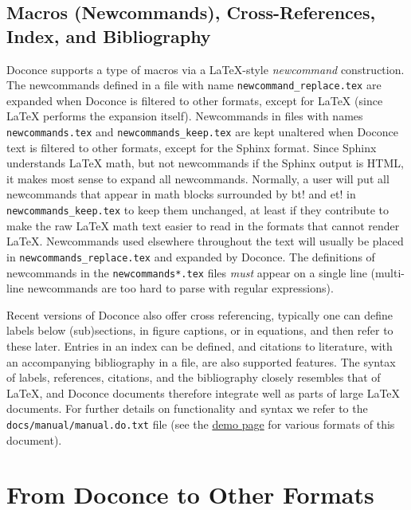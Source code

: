 \documentclass{article}
\begin{document}
\subsection{Macros (Newcommands), Cross-References, Index, and Bibliography}

Doconce supports a type of macros via a {\LaTeX}-style \emph{newcommand}
construction.  The newcommands defined in a file with name
{\fontsize{10pt}{10pt}\verb!newcommand_replace.tex!} are expanded when Doconce is filtered to
other formats, except for {\LaTeX} (since {\LaTeX} performs the expansion
itself).  Newcommands in files with names {\fontsize{10pt}{10pt}\verb!newcommands.tex!} and
{\fontsize{10pt}{10pt}\verb!newcommands_keep.tex!} are kept unaltered when Doconce text is
filtered to other formats, except for the Sphinx format. Since Sphinx
understands {\LaTeX} math, but not newcommands if the Sphinx output is
HTML, it makes most sense to expand all newcommands.  Normally, a user
will put all newcommands that appear in math blocks surrounded by
{\fontsize{10pt}{10pt}\verb!!bt!} and {\fontsize{10pt}{10pt}\verb!!et!} in {\fontsize{10pt}{10pt}\verb!newcommands_keep.tex!} to keep them unchanged, at
least if they contribute to make the raw {\LaTeX} math text easier to
read in the formats that cannot render {\LaTeX}.  Newcommands used
elsewhere throughout the text will usually be placed in
{\fontsize{10pt}{10pt}\verb!newcommands_replace.tex!} and expanded by Doconce.  The definitions of
newcommands in the {\fontsize{10pt}{10pt}\verb!newcommands*.tex!} files \emph{must} appear on a single
line (multi-line newcommands are too hard to parse with regular
expressions).

Recent versions of Doconce also offer cross referencing, typically
one can define labels below (sub)sections, in figure captions, or
in equations, and then refer to these later. Entries in an index
can be defined, and citations to literature, with an accompanying
bibliography in a file, are also supported features. The syntax
of labels, references, citations, and the bibliography closely resembles
that of {\LaTeX}, and Doconce documents therefore integrate well as parts
of large {\LaTeX} documents. For further details on functionality and syntax
we refer to the {\fontsize{10pt}{10pt}\verb!docs/manual/manual.do.txt!} file
(see the \href{https://doconce.googlecode.com/hg/trunk/docs/demos/manual/index.html}{demo page} for various formats of this document).




\section{From Doconce to Other Formats}
\end{document}
